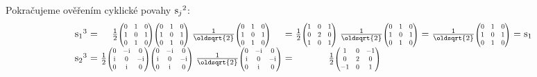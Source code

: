 \documentclass[10pt,a4paper]{article}
\newcommand{\const}[1]{\text{\rmfamily\upshape #1}}
\newcommand{\mat}[1]{
    \begin{pmatrix}
        #1
    \end{pmatrix}
}
\newcommand{\smat}[2][1]{
    \scalebox{#1}{$\mat{#2}$}
}
\renewcommand{\i}{\const{i}}
\begin{document}
Pokračujeme ověřením cyklické povahy ${\const{s}_j}^2$:
\begin{equation*}
    \def\={\hspace{-5pt}&\hspace{-2pt}=\hspace{-2pt}&\hspace{-5pt}}
    \begin{array}{rcccccccl}
        {\const{s}_1}^3
        \=
        \frac{1}{2} \smat[0.7]{
            0 & 1 & 0 \\
            1 & 0 & 1 \\
            0 & 1 & 0
        }
        \smat[0.7]{
            0 & 1 & 0 \\
            1 & 0 & 1 \\
            0 & 1 & 0
        }
        \;
        \frac{1}{\oldsqrt{2}} \smat[0.7]{
            0 & 1 & 0 \\
            1 & 0 & 1 \\
            0 & 1 & 0
        }
        \=
        \frac{1}{2} \smat[0.7]{
            1 & 0 & 1 \\
            0 & 2 & 0 \\
            1 & 0 & 1
        }
        \;
        \frac{1}{\oldsqrt{2}} \smat[0.7]{
            0 & 1 & 0 \\
            1 & 0 & 1 \\
            0 & 1 & 0
        }
        \=
        \frac{1}{\oldsqrt{2}} \smat[0.7]{
            0 & 1 & 0 \\
            1 & 0 & 1 \\
            0 & 1 & 0
        }
        \=
        \const{s}_1
        \\
        {\const{s}_2}^3
        \=
        \frac{1}{2} \smat[0.7]{
            0 & -\i & 0 \\
            \i & 0 & -\i \\
            0 & \i & 0
        }
        \smat[0.7]{
            0 & -\i & 0 \\
            \i & 0 & -\i \\
            0 & \i & 0
        }
        \;
        \frac{1}{\oldsqrt{2}} \smat[0.7]{
            0 & -\i & 0 \\
            \i & 0 & -\i \\
            0 & \i & 0
        }
        \=
        \frac{1}{2} \smat[0.7]{
            1 & 0 & -1 \\
            0 & 2 & 0 \\
            -1 & 0 & 1
        }

\end{array}
\end{equation*}
\end{document}
